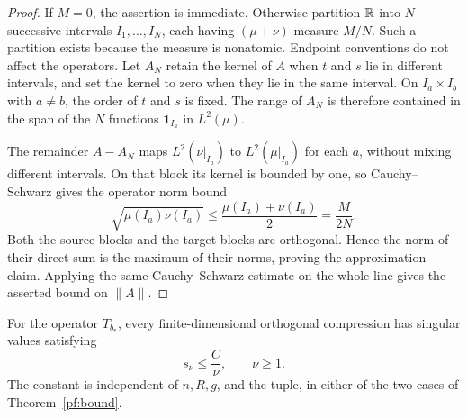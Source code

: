 \begin{proof}
If $M=0$, the assertion is immediate.  Otherwise partition $\mathbb R$ into
$N$ successive intervals $I_1,\ldots,I_N$, each having
$(\mu+\nu)$-measure $M/N$.  Such a partition exists because the measure
is nonatomic.  Endpoint conventions do not affect the operators.
Let $A_N$ retain the kernel of $A$ when $t$ and $s$ lie in different
intervals, and set the kernel to zero when they lie in the same
interval.  On $I_a\times I_b$ with $a\ne b$, the order of $t$ and $s$
is fixed.  The range of $A_N$ is therefore contained in the span of the
$N$ functions $\mathbf1_{I_a}$ in $L^2(\mu)$.

The remainder $A-A_N$ maps $L^2(\nu|_{I_a})$ to
$L^2(\mu|_{I_a})$ for each $a$, without mixing different intervals.
On that block its kernel is bounded by one, so Cauchy--Schwarz gives
the operator norm bound
\[
 \sqrt{\mu(I_a)\nu(I_a)}
 \le \frac{\mu(I_a)+\nu(I_a)}2=\frac{M}{2N}.
\]
Both the source blocks and the target blocks are orthogonal.  Hence
the norm of their direct sum is the maximum of their norms, proving
the approximation claim.  Applying the same Cauchy--Schwarz estimate
on the whole line gives the asserted bound on $\|A\|$.
\end{proof}

\begin{lemma}
\label{pf:terminal-singular}
For the operator $T_{b_*}$, every finite-dimensional orthogonal
compression has singular values satisfying
\begin{equation}
 s_\nu\le \frac C\nu,\qquad \nu\ge1.
 \label{pf:singular-decay}
\end{equation}
The constant is independent of $n,R,g$, and the tuple, in either of
the two cases of Theorem~\ref{pf:bound}.
\end{lemma}

